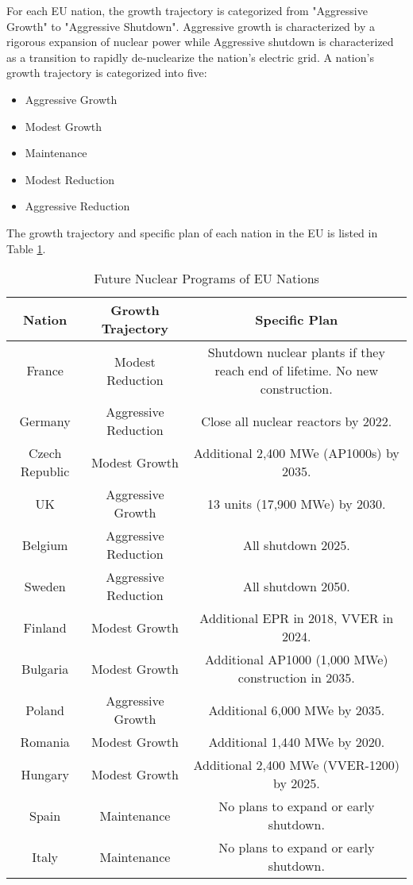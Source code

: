 For each EU nation, the growth trajectory is categorized from
"Aggressive Growth" to "Aggressive Shutdown". Aggressive growth is
characterized by a rigorous expansion of nuclear power while 
Aggressive shutdown is characterized as a transition to rapidly
de-nuclearize the nation's electric grid. A nation's growth trajectory is
categorized into five:

\begin{itemize}
	\item Aggressive Growth
	\item Modest Growth 
	\item Maintenance
	\item Modest Reduction
	\item Aggressive Reduction
\end{itemize}

The growth trajectory and specific plan of each nation in the EU 
is listed in Table \ref{tab:eu_growth}.

\begin{table}[h]
	\centering
	\label{tab:eu_growth}
		\begin{tabular}{|c|c|c|}
			\hline
			Nation & Growth Trajectory & Specific Plan \\
			\hline
			France & Modest Reduction & Shutdown nuclear plants if they reach end of lifetime. No new construction.\\
			Germany & Aggressive Reduction & Close all nuclear reactors by 2022.\\
			Czech Republic & Modest Growth & Additional 2,400 MWe (AP1000s) by 2035.\\
			UK & Aggressive Growth & 13 units (17,900 MWe) by 2030.\\
			Belgium & Aggressive Reduction & All shutdown 2025.\\
			Sweden & Aggressive Reduction & All shutdown 2050.\\
			Finland & Modest Growth & Additional EPR in 2018, VVER in 2024.\\
			Bulgaria & Modest Growth & Additional AP1000 (1,000 MWe) construction in 2035. \\
			Poland & Aggressive Growth & Additional 6,000 MWe by 2035.\\
			Romania & Modest Growth & Additional 1,440 MWe by 2020. \\
			Hungary & Modest Growth & Additional 2,400 MWe (VVER-1200) by 2025. \\ 
			Spain & Maintenance & No plans to expand or early shutdown. \\
			Italy & Maintenance  & No plans to expand or early shutdown. \\
			\hline
		\end{tabular}
	\caption {Future Nuclear Programs of EU Nations \cite{world_nuclear_association_nuclear_2017}}
\end{table}

